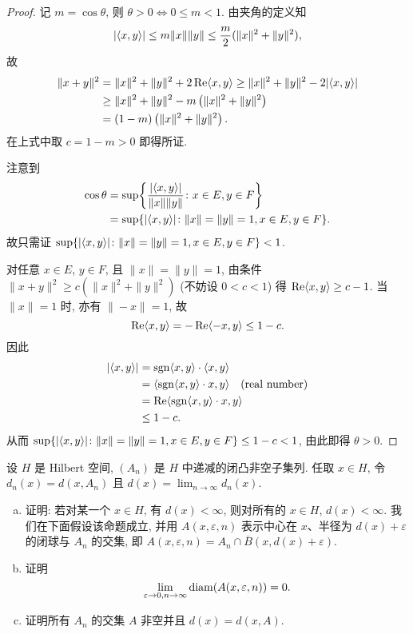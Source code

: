 \begin{proof}
    \necessary
    记 $m=\cos\theta$, 则 $\theta>0\iff 0\leq m<1$. 由夹角的定义知
    \[|\langle x,y\rangle|\leq m\|x\|\|y\|\leq\frac{m}{2}(\|x\|^2+\|y\|^2),\]
    故
    \begin{align*}
        \|x+y\|^2
        &=\|x\|^2+\|y\|^2+2\operatorname{Re}\langle x,y\rangle\geq \|x\|^2+\|y\|^2-2|\langle x,y\rangle| \\
        &\geq \|x\|^2+\|y\|^2-m\left(\|x\|^2+\|y\|^2\right) \\
        &=(1-m)\left(\|x\|^2+\|y\|^2\right).
    \end{align*}
    在上式中取 $c=1-m>0$ 即得所证.

    \sufficient
    注意到
    \begin{align*}
        \cos\theta
        & =\sup\biggl\{\frac{|\langle x,y\rangle|}{\|x\|\|y\|}\colon x\in E,y\in F\biggr\} \\
        & =\sup\{|\langle x,y\rangle|\colon \|x\|=\|y\|=1,x\in E,y\in F\}.
    \end{align*}
    故只需证 $\sup\{|\langle x,y\rangle|\colon \|x\|=\|y\|=1,x\in E,y\in F\}<1$.

    对任意 $x\in E$, $y\in F$, 且 $\|x\|=\|y\|=1$, 由条件 $\|x+y\|^2\geq c(\|x\|^2+\|y\|^2)$
    (不妨设 $0<c<1$) 得 $\operatorname{Re}\langle x,y\rangle\geq c-1$.
    当 $\|x\|=1$ 时, 亦有 $\|-x\|=1$, 故
    \[\operatorname{Re}\langle x,y\rangle=-\operatorname{Re}\langle-x,y\rangle\leq 1-c.\]
    因此
    \begin{align*}
        |\langle x,y\rangle|
        & =\operatorname{sgn}\langle x,y\rangle\cdot\langle x,y\rangle \\
        & =\langle\operatorname{sgn}\langle x,y\rangle\cdot x,y\rangle\quad(\text{real number})\\
        & =\operatorname{Re}\langle\operatorname{sgn}\langle x,y\rangle\cdot x,y\rangle \\
        & \leq 1-c.
    \end{align*}
    从而 $\sup\{|\langle x,y\rangle|\colon \|x\|=\|y\|=1,x\in E,y\in F\}\leq 1-c<1$, 由此即得 $\theta>0$.
\end{proof}



\begin{exercise}
    设 $H$ 是 Hilbert 空间, $(A_n)$ 是 $H$ 中递减的闭凸非空子集列. 
    任取 $x\in H$, 令 $d_n(x)=d(x,A_n)$ 且 $d(x)=\lim_{n\to\infty}d_n(x)$.
    \begin{enumerate}[(a)]
    \item 证明: 若对某一个 $x\in H$, 有 $d(x)<\infty$, 
    则对所有的 $x\in H$, $d(x)<\infty$. 我们在下面假设该命题成立, 
    并用 $A(x,\varepsilon,n)$ 表示中心在 $x$、半径为 $d(x)+\varepsilon$ 的闭球与 $A_n$ 的交集, 
    即 $A(x,\varepsilon,n)=A_n\cap\overline{B}(x,d(x)+\varepsilon)$.
    \item 证明
    \[\lim_{\varepsilon\to 0,n\to\infty}\operatorname{diam}(A(x,\varepsilon,n))=0.\]
    \item 证明所有 $A_n$ 的交集 $A$ 非空并且 $d(x)=d(x,A)$.
    \end{enumerate}
\end{exercise}

